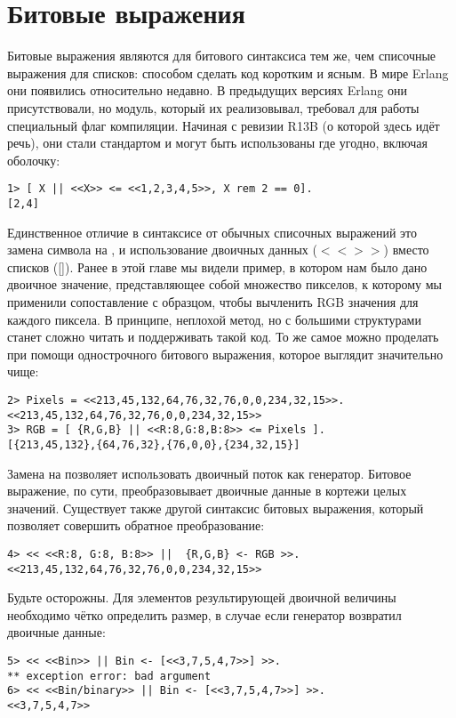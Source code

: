 \section{Битовые выражения}
Битовые выражения являются для битового синтаксиса тем же, чем списочные выражения для списков: способом сделать код коротким и ясным.
В мире Erlang они появились относительно недавно.
В предыдущих версиях Erlang они присутствовали, но модуль, который их реализовывал, требовал для работы специальный флаг компиляции.
Начиная с ревизии R13B (о которой здесь идёт речь), они стали стандартом и могут быть использованы где угодно, включая оболочку:
\begin{lstlisting}[style=repl]
1> [ X || <<X>> <= <<1,2,3,4,5>>, X rem 2 == 0].    
[2,4]
\end{lstlisting}

Единственное отличие в синтаксисе от обычных списочных выражений это замена символа \ops{$<-$} на \ops{$<=$}, и использование двоичных данных ($<< >>$) вместо списков ([]).
Ранее в этой главе мы видели пример, в котором нам было дано двоичное значение, представляющее собой множество пикселов, к которому мы применили сопоставление с образцом, чтобы вычленить RGB значения для каждого пиксела.
В принципе, неплохой метод, но с большими структурами станет сложно читать и поддерживать такой код.
То же самое можно проделать при помощи однострочного битового выражения, которое выглядит значительно чище:
\begin{lstlisting}[style=repl]
2> Pixels = <<213,45,132,64,76,32,76,0,0,234,32,15>>.
<<213,45,132,64,76,32,76,0,0,234,32,15>>
3> RGB = [ {R,G,B} || <<R:8,G:8,B:8>> <= Pixels ].
[{213,45,132},{64,76,32},{76,0,0},{234,32,15}]
\end{lstlisting}

Замена \ops{$<-$} на \ops{$<=$} позволяет использовать двоичный поток как генератор.
Битовое выражение, по сути, преобразовывает двоичные данные в кортежи целых значений.
Существует также другой синтаксис битовых выражения, который позволяет совершить обратное преобразование:
\begin{lstlisting}[style=repl]
4> << <<R:8, G:8, B:8>> ||  {R,G,B} <- RGB >>.
<<213,45,132,64,76,32,76,0,0,234,32,15>>
\end{lstlisting}

Будьте осторожны.
Для элементов результирующей двоичной величины необходимо чётко определить размер, в случае если генератор возвратил двоичные данные:
\begin{lstlisting}[style=repl]
5> << <<Bin>> || Bin <- [<<3,7,5,4,7>>] >>.
** exception error: bad argument
6> << <<Bin/binary>> || Bin <- [<<3,7,5,4,7>>] >>. 
<<3,7,5,4,7>>
\end{lstlisting}

